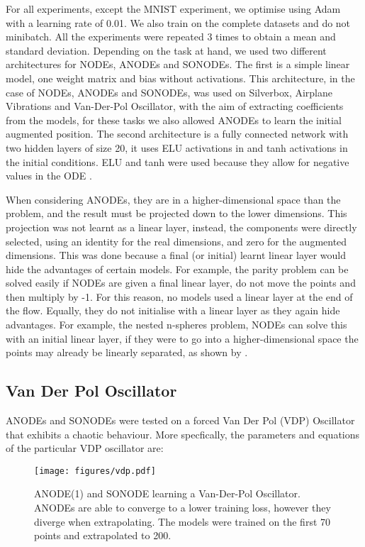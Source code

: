 \documentclass{article}
\theoremstyle{remark}
\theoremstyle{definition}
\begin{document}
For all experiments, except the MNIST experiment, we optimise using Adam with a learning rate of 0.01. We also train on the complete datasets and do not minibatch. All the experiments were repeated 3 times to obtain a mean and standard deviation. Depending on the task at hand, we used two different architectures for NODEs, ANODEs and SONODEs. The first is a simple linear model, one weight matrix and bias without activations. This architecture, in the case of NODEs, ANODEs and SONODEs, was used on Silverbox, Airplane Vibrations and Van-Der-Pol Oscillator, with the aim of extracting coefficients from the models, for these tasks we also allowed ANODEs to learn the initial augmented position. The second architecture is a fully connected network with two hidden layers of size 20, it uses ELU activations in  and tanh activations in the initial conditions. ELU and tanh were used because they allow for negative values in the ODE \cite{massaroli2020dissecting}.  

When considering ANODEs, they are in a higher-dimensional space than the problem, and the result must be projected down to the lower dimensions. This projection was not learnt as a linear layer, instead, the components were directly selected, using an identity for the real dimensions, and zero for the augmented dimensions. This was done because a final (or initial) learnt linear layer would hide the advantages of certain models. For example, the parity problem can be solved easily if NODEs are given a final linear layer, do not move the points and then multiply by -1. For this reason, no models used a linear layer at the end of the flow. Equally, they do not initialise with a linear layer as they again hide advantages. For example, the nested n-spheres problem, NODEs can solve this with an initial linear layer, if they were to go into a higher-dimensional space the points may already be linearly separated, as shown by \citet{massaroli2020dissecting}.


\subsection{Van Der Pol Oscillator}

ANODEs and SONODEs were tested on a forced Van Der Pol (VDP) Oscillator that exhibits a chaotic behaviour. More specfically, the parameters and equations of the particular VDP oscillator are:


\begin{figure}[ht]
\centering
    \vspace{-7pt}
    \texttt{[image: figures/vdp.pdf]}
    \vspace{-10pt}
    \caption{ANODE(1) and SONODE learning a Van-Der-Pol Oscillator. ANODEs are able to converge to a lower training loss, however they diverge when extrapolating. The models were trained on the first 70 points and extrapolated to 200.}
    \label{fig: vdp}
\end{figure}
\end{document}
